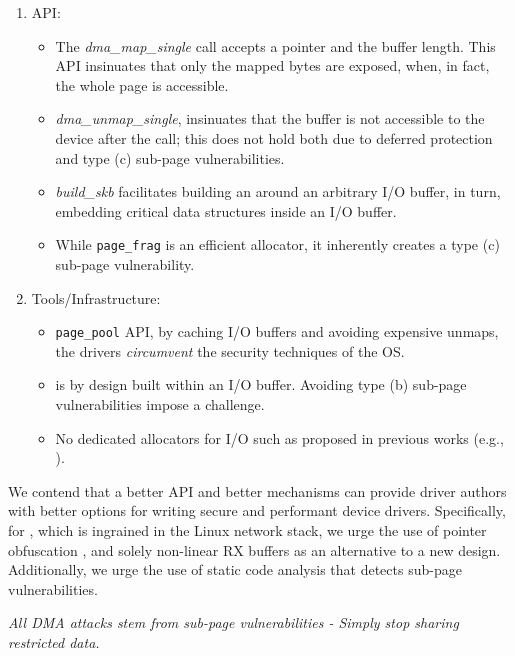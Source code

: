 \begin{enumerate}
    \item API: 
    \begin{itemize}
        \item The \textit{dma\_map\_single} call accepts a pointer and the buffer length. This API insinuates that only the mapped bytes are exposed, when, in fact, the whole page is accessible.
        \item \textit{dma\_unmap\_single}, insinuates that the buffer is not accessible to the device after the call; this does not hold both due to deferred protection and type (c) sub-page vulnerabilities.
        \item \textit{build\_skb} facilitates building an \skb{} around an arbitrary I/O buffer, in turn, embedding critical data structures inside an I/O buffer.
        \item While \texttt{page\_frag} is an efficient allocator, it inherently creates a type (c) sub-page vulnerability.
    \end{itemize} 
    \item Tools/Infrastructure: 
    \begin{itemize}
            \item \texttt{page\_pool} API, by caching I/O buffers and avoiding expensive unmaps, the drivers \emph{circumvent} the security techniques of the OS. 
            \item \shinfo{} is by design built within an I/O buffer. Avoiding type (b) sub-page vulnerabilities impose a challenge.
            \item No dedicated allocators for I/O such as proposed in previous works (e.g., \cite{MSMT18,MMT16}).
    \end{itemize}
\end{enumerate}

We contend that a better API and better mechanisms can provide driver authors with better options for writing secure and performant device drivers. Specifically, for \shinfo{}, which is ingrained in the Linux network stack, we urge the use of pointer obfuscation \cite{Coo17}, and solely non-linear RX buffers as an alternative to a new design. Additionally, we urge the use of static code analysis that detects sub-page vulnerabilities.

\emph{All DMA attacks stem from sub-page vulnerabilities - Simply stop sharing restricted data.}

